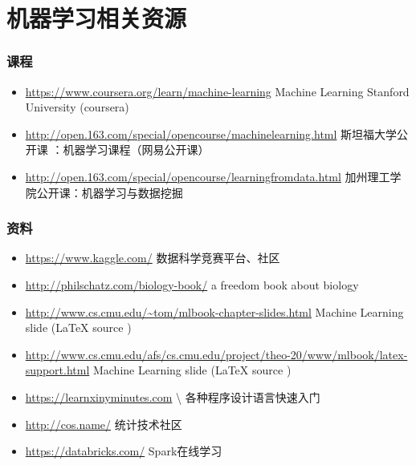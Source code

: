 \documentclass{beamer}
\begin{document}
\section{机器学习相关资源}
\label{sec-6}
\begin{frame}
\frametitle{课程}
\label{sec-6-1}


\begin{itemize}
\item \href{https://www.coursera.org/learn/machine-learning}{https://www.coursera.org/learn/machine-learning}  Machine Learning Stanford University (coursera)
\item \href{http://open.163.com/special/opencourse/machinelearning.html}{http://open.163.com/special/opencourse/machinelearning.html}  斯坦福大学公开课 ：机器学习课程（网易公开课）
\item \href{http://open.163.com/special/opencourse/learningfromdata.html}{http://open.163.com/special/opencourse/learningfromdata.html} 加州理工学院公开课：机器学习与数据挖掘
\end{itemize}
\end{frame}
\begin{frame}
\frametitle{资料}
\label{sec-6-2}

\begin{itemize}
\item \href{https://www.kaggle.com/}{https://www.kaggle.com/}
    数据科学竞赛平台、社区
\item \href{http://philschatz.com/biology-book/}{http://philschatz.com/biology-book/}
    a  freedom book about biology
\item \href{http://www.cs.cmu.edu/~tom/mlbook-chapter-slides.html}{http://www.cs.cmu.edu/\textasciitilde tom/mlbook-chapter-slides.html}
    Machine Learning slide (\LaTeX{} source )
\item \href{http://www.cs.cmu.edu/afs/cs.cmu.edu/project/theo-20/www/mlbook/latex-support.html}{http://www.cs.cmu.edu/afs/cs.cmu.edu/project/theo-20/www/mlbook/latex-support.html}
    Machine Learning slide (\LaTeX{} source )
\item \href{https://learnxinyminutes.com}{https://learnxinyminutes.com}  \textbackslash{}
    各种程序设计语言快速入门
\item \href{http://cos.name/}{http://cos.name/}
    统计技术社区
\item \href{https://databricks.com/}{https://databricks.com/}
    Spark在线学习
\end{itemize}
\end{frame}
\end{document}
